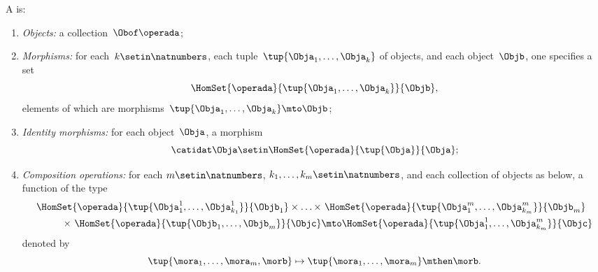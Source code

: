 \begin{ctdefinition}[Multicategory]
    \label{def:multicategory}
    A  is:

    \constit
    \begin{enumerate}
        \item \emph{Objects:} a collection~$\Obof\operada$;
        \item \emph{Morphisms:} for each~$k \setin \natnumbers$, each tuple~$\tup{\Obja_1,\ldots, \Obja_k}$ of objects, and each object~$ \Objb$, one specifies a set~
        \begin{equation}
\HomSet{\operada}{\tup{\Obja_1,\ldots,\Obja_k}}{\Objb},
\end{equation}
elements of which are morphisms~$\tup{\Obja_1,\ldots,\Obja_k}\mto \Objb$;
        \item \emph{Identity morphisms:} for each object~$\Obja$, a morphism
              \begin{equation}
                  \catidat\Obja \setin \HomSet{\operada}{\tup{\Obja}}{\Obja};
              \end{equation}
        \item \emph{Composition operations:} for each $m \setin \natnumbers$, $k_1, \dots, k_m \setin \natnumbers$, and each collection of objects as below, a function of the type
              \begin{equation}
                  \begin{aligned}
                      \HomSet{\operada}{ \tup{\Obja_{1}^1, \ldots, \Obja_{k_1}^1} }{\Objb_1}   \times \ldots \times & \ \HomSet{\operada}{ \tup{\Obja_{1}^m, \ldots, \Obja_{k_m}^m} }{\Objb_m}  \\
                     \qquad \times \  \HomSet{\operada}{ \tup{\Objb_{1}, \ldots,\Objb_{m}} }{\Objc} & \mto \HomSet{\operada}{\tup{\Obja_{1}^1, \ldots, \Obja_{k_m}^m}}{\Objc} 
                  \end{aligned}
                   \end{equation}
                  denoted by
                  \begin{equation}
\tup{\mora_1,\ldots,\mora_m,\morb}                                                                                                                                                                                   \mapsto \tup{\mora_1,\ldots, \mora_m}\mthen \morb.
\end{equation}
    \end{enumerate}
    \condit
    \begin{enumerate}

\end{enumerate}
\end{ctdefinition}
